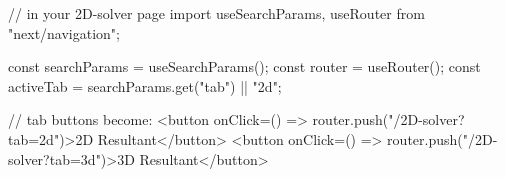 // in your 2D-solver page
import { useSearchParams, useRouter } from "next/navigation";

const searchParams = useSearchParams();
const router = useRouter();
const activeTab = searchParams.get("tab") || "2d";

// tab buttons become:
<button onClick={() => router.push("/2D-solver?tab=2d")}>2D Resultant</button>
<button onClick={() => router.push("/2D-solver?tab=3d")}>3D Resultant</button>